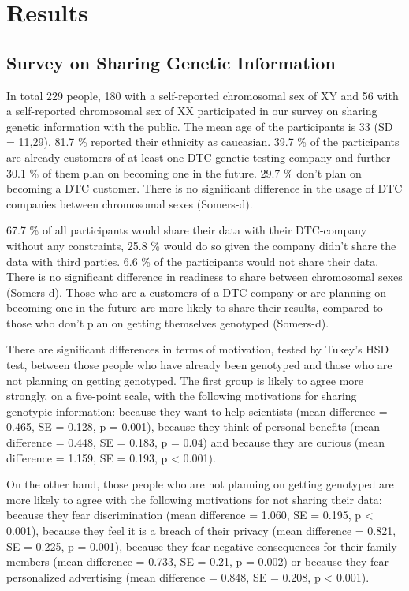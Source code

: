 \documentclass[10pt]{article}
\begin{document}
\section*{Results}

\subsection*{Survey on Sharing Genetic Information}
In total 229 people, 180 with a self-reported chromosomal sex of XY and 56 with a self-reported chromosomal sex of XX participated in our survey on sharing genetic information with the public. 
The mean age of the participants is 33 (SD = 11,29). 81.7 \% reported their ethnicity as caucasian. 39.7 \% of the participants are already 
customers of at least one DTC genetic testing company and further 30.1 \% of them plan on becoming one in the future. 29.7 \% don't plan on 
becoming a DTC customer. There is no significant difference in the usage of DTC companies between chromosomal sexes (Somers-d). 

67.7 \% of all participants would share their data with their DTC-company without any constraints, 25.8 \% would do so given the company 
didn't share the data with third parties. 6.6 \% of the participants would not share their data. There is no significant difference in 
readiness to share between chromosomal sexes (Somers-d). Those who are a customers of a DTC company or are planning on becoming one in 
the future are more likely to share their results, compared to those who don't plan on getting themselves genotyped (Somers-d). 

There are significant differences in terms of motivation, tested by Tukey's HSD test, between those people who have already been genotyped 
and those who are not planning on getting genotyped. The first group is likely to agree more strongly, on a five-point scale, with the following 
motivations for sharing genotypic information: because they want to help scientists (mean difference = 0.465, SE = 0.128, p = 0.001), 
because they think of personal benefits (mean difference = 0.448, SE = 0.183, p = 0.04) and because they are curious (mean difference = 1.159, SE = 0.193, p < 0.001). 

On the other hand, those people who are not planning on getting genotyped are more likely to agree with the following motivations 
for not sharing their data: because they fear discrimination (mean difference = 1.060, SE = 0.195, p < 0.001), because they feel 
it is a breach of their privacy (mean difference = 0.821, SE = 0.225, p = 0.001), because they fear negative consequences for their 
family members (mean difference = 0.733, SE = 0.21, p = 0.002) or because they fear personalized advertising (mean difference = 0.848, SE = 0.208, p < 0.001).
\end{document}
